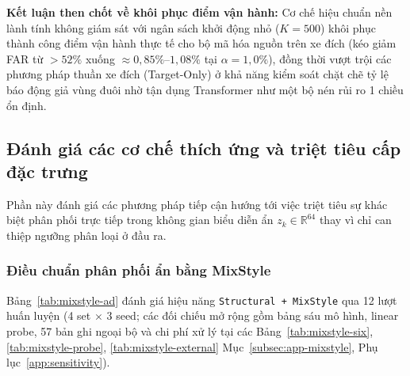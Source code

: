 \documentclass[12pt, a4paper, reqno, oneside]{book}
\DeclareRobustCommand{\code}[1]{\nolinkurl{#1}}
\begin{document}
\FloatBarrier

\noindent\textbf{Kết luận then chốt về khôi phục điểm vận hành:} Cơ chế hiệu chuẩn nền lành tính không giám sát với ngân sách khởi động nhỏ ($K=500$) khôi phục thành công điểm vận hành thực tế cho bộ mã hóa nguồn trên xe đích (kéo giảm FAR từ $>52\%$ xuống $\approx 0{,}85\%\text{--}1{,}08\%$ tại $\alpha=1{,}0\%$), đồng thời vượt trội các phương pháp thuần xe đích (Target-Only) ở khả năng kiểm soát chặt chẽ tỷ lệ báo động giả vùng đuôi nhờ tận dụng Transformer như một bộ nén rủi ro 1 chiều ổn định.


\subsection{Đánh giá các cơ chế thích ứng và triệt tiêu cấp đặc trưng}\label{sec:feature-invariance}
Phần này đánh giá các phương pháp tiếp cận hướng tới việc triệt tiêu sự khác biệt phân phối trực tiếp trong không gian biểu diễn ẩn $z_k \in \mathbb{R}^{64}$ thay vì chỉ can thiệp ngưỡng phân loại ở đầu ra.

\subsubsection{Điều chuẩn phân phối ẩn bằng MixStyle}\label{subsec:eval-mixstyle}
Bảng~\ref{tab:mixstyle-ad} đánh giá hiệu năng \code{Structural + MixStyle} qua 12 lượt huấn luyện (4 set $\times$ 3 seed; các đối chiếu mở rộng gồm bảng sáu mô hình, linear probe, 57 bản ghi ngoại bộ và chi phí xử lý tại các Bảng~\ref{tab:mixstyle-six}, \ref{tab:mixstyle-probe}, \ref{tab:mixstyle-external} Mục~\ref{subsec:app-mixstyle}, Phụ lục~\ref{app:sensitivity}).
\end{document}
